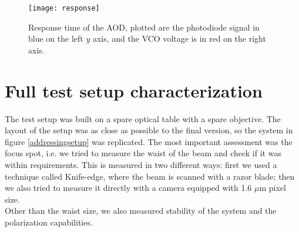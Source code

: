 \begin{figure}
\centering
\texttt{[image: response]}
\caption{Response time of the AOD, plotted are the photodiode signal in blue on the left $y$ axis, and the VCO voltage is in red on the right axis.}
\label{response}
\end{figure}

\section{Full test setup characterization}
The test setup was built on a spare optical table with a spare objective. The layout of the setup was as close as possible to the final version, so the system in figure \ref{addressingsetup} was replicated. The most important assessment was the focus spot, i.e. we tried to measure the waist of the beam and check if it was within requirements.
This is measured in two different ways: first we used a technique called Knife-edge, where the beam is scanned with a razor blade; then we also tried to measure it directly with a camera equipped with 1.6 $\mu$m pixel size.\\
Other than the waist size, we also measured stability of the system and the polarization capabilities.

